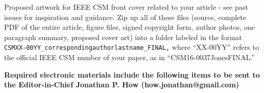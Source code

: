 \item Proposed artwork for IEEE CSM front cover related to your article - see past issues for inspiration and guidance.
\eee
Zip up all of these files (source, complete PDF of the entire article, figure files, signed copyright form, author photos, one paragraph summary, proposed cover art) into a folder labeled in the format 
\verb!CSMXX-00YY_correspondingauthorlastname_FINAL,! 
where “XX-00YY” refers to the official IEEE CSM number of your paper, as in “CSM16-0037JonesFINAL.”


\bc
\textbf{Required electronic materials include the following items to be sent to the Editor-in-Chief Jonathan P. How (how.jonathan@gmail.com)
}\ec